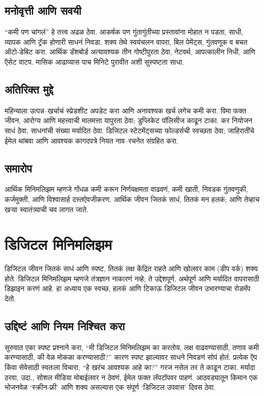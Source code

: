 \section*{मनोवृत्ती आणि सवयी}

“कमी पण चांगलं” हे तत्त्व अढळ ठेवा. आकर्षक पण गुंतागुंतीच्या प्रस्तावांना मोहात न पडता, साधी, व्यापक आणि ट्रॅक होणारी साधनं निवडा. शक्य तेथे स्वयंचलन वापरा, बिल पेमेंट्स, गुंतवणूक व बचत ऑटो-डेबिट करा. आर्थिक डॅशबोर्ड अत्यावश्यक तीन गोष्टीपुरता ठेवा, नेटवर्थ, आपत्कालीन निधी, आणि ऍसेट वाटप. मासिक आढाव्यास पाच मिनिटे पुरावीत अशी सुस्पष्टता साधा.

\section*{अतिरिक्त मुद्दे}

महिन्याला उत्पन्न–खर्चाचं स्प्रेडशीट अपडेट करा आणि अनावश्यक खर्च लगेच कमी करा. विमा फक्त जीवन, आरोग्य आणि महत्त्वाची मालमत्ता यापुरता ठेवा; डुप्लिकेट पॉलिसीज काढून टाका. कर नियोजन साधं ठेवा, साधनांची संख्या मर्यादित ठेवा. डिजिटल स्टेटमेंट्सच्या फोल्डर्सची स्वच्छता ठेवा; जाहिरातींचे ईमेल थांबवा आणि आवश्यक कागदपत्रे नियत नाव–रचनेत संग्रहित करा.

\section*{समारोप}

आर्थिक मिनिमलिझम म्हणजे गोंधळ कमी करून निर्णयक्षमता वाढवणं, कमी खाती, निवडक गुंतवणुकी, कर्जमुक्ती, आणि विश्वासार्ह दस्तऐवजीकरण. आर्थिक जीवन जितकं साधं, तितकं मन हलकं; आणि तेव्हाच खऱ्या स्वातंत्र्याची चव लागत जाते.

\chapter{डिजिटल मिनिमलिझम}

डिजिटल जीवन जितकं साधं आणि स्पष्ट, तितकं लक्ष केंद्रित राहते आणि खोलवर काम (डीप वर्क) शक्य होते. डिजिटल मिनिमलिझम म्हणजे तंत्रज्ञान नाकारणं नव्हे; ते उद्देशपूर्ण, अर्थपूर्ण आणि मर्यादित वापरासाठी डिझाइन करणं आहे. हा अध्याय एक स्वच्छ, हलकं आणि टिकाऊ डिजिटल जीवन उभारण्याचा रोडमॅप देतो.

\section*{उद्दिष्टं आणि नियम निश्चित करा}

सुरुवात एका स्पष्ट प्रश्नाने करा, “मी डिजिटल मिनिमलिझम का करतोय, लक्ष वाढवण्यासाठी, तणाव कमी करण्यासाठी, की वेळ मोकळा करण्यासाठी?” कारण स्पष्ट झाल्यावर साधने निवडणं सोपं होतं. प्रत्येक ऍप किंवा सेवेसाठी स्वतःला विचारा, “हे खरंच आवश्यक आहे का?” गरज नसेल तर ते काढून टाका. मर्यादा ठरवा, उदा., सोशल मीडिया मोबाईलवर न ठेवणं, ईमेल फक्त लॅपटॉपवर पाहणं. आठवड्यातून किमान एक भोजनवेळ ‘स्क्रीन-फ्री’ आणि शक्य असल्यास एक संपूर्ण ‘डिजिटल उपवास’ दिवस ठेवा.

